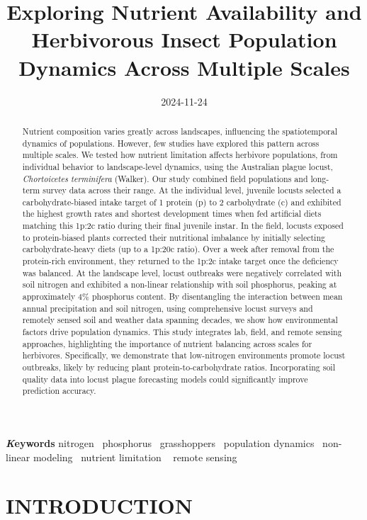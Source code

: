 \documentclass[
]{article}
\title{Exploring Nutrient Availability and Herbivorous Insect Population
Dynamics Across Multiple Scales}
\author{\asep\asep\asep\asep\asep\asep\asep\asep\asep}
\date{2024-11-24}
\begin{document}
\maketitle
\begin{abstract}
Nutrient composition varies greatly across landscapes, influencing the
spatiotemporal dynamics of populations. However, few studies have
explored this pattern across multiple scales. We tested how nutrient
limitation affects herbivore populations, from individual behavior to
landscape-level dynamics, using the Australian plague locust,
\emph{Chortoicetes terminifera} (Walker). Our study combined field
populations and long-term survey data across their range. At the
individual level, juvenile locusts selected a carbohydrate-biased intake
target of 1 protein (p) to 2 carbohydrate (c) and exhibited the highest
growth rates and shortest development times when fed artificial diets
matching this 1p:2c ratio during their final juvenile instar. In the
field, locusts exposed to protein-biased plants corrected their
nutritional imbalance by initially selecting carbohydrate-heavy diets
(up to a 1p:20c ratio). Over a week after removal from the protein-rich
environment, they returned to the 1p:2c intake target once the
deficiency was balanced. At the landscape level, locust outbreaks were
negatively correlated with soil nitrogen and exhibited a non-linear
relationship with soil phosphorus, peaking at approximately 4\%
phosphorus content. By disentangling the interaction between mean annual
precipitation and soil nitrogen, using comprehensive locust surveys and
remotely sensed soil and weather data spanning decades, we show how
environmental factors drive population dynamics. This study integrates
lab, field, and remote sensing approaches, highlighting the importance
of nutrient balancing across scales for herbivores. Specifically, we
demonstrate that low-nitrogen environments promote locust outbreaks,
likely by reducing plant protein-to-carbohydrate ratios. Incorporating
soil quality data into locust plague forecasting models could
significantly improve prediction accuracy.
\end{abstract}
{\bfseries \emph Keywords}
\def\sep{\textbullet\ }
nitrogen \sep phosphorus \sep grasshoppers \sep population
dynamics \sep non-linear modeling \sep nutrient limitation \sep 
remote sensing



\section{INTRODUCTION}\label{introduction}
\end{document}
